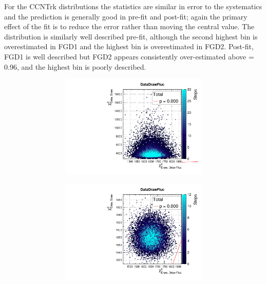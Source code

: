 For the CCNTrk distributions the statistics are similar in error to the systematics and the prediction is generally good in \pmu pre-fit and post-fit; again the primary effect of the fit is to reduce the error rather than moving the central value. The \cosmu distribution is similarly well described pre-fit, although the second highest \cosmu bin is overestimated in FGD1 and the highest \cosmu bin is overestimated in FGD2. Post-fit, FGD1 is well described but FGD2 appears consistently over-estimated above \cosmu= 0.96, and the highest \cosmu bin is poorly described.
\begin{figure}[h]
	\begin{subfigure}[t]{\textwidth}
	\begin{subfigure}[t]{0.24\textwidth}
		\includegraphics[width=\textwidth, trim={0mm 0mm 0mm 8mm}, clip,page=64]{figures/mach3/data/priorpred/2017b_NewDet_3Xsec_4Det_5Flux_NewXSecTune_Data_merge_PriorPred_procs}
	\end{subfigure}
	\begin{subfigure}[t]{0.24\textwidth}
		\includegraphics[width=\textwidth, trim={0mm 0mm 0mm 8mm}, clip,page=64]{figures/mach3/data/postpred/2017b_NewData_NewDet_UpdXsecStep_2Xsec_4Det_5Flux_0_PostPred_procs}

\end{subfigure}
\end{subfigure}
\end{figure}
